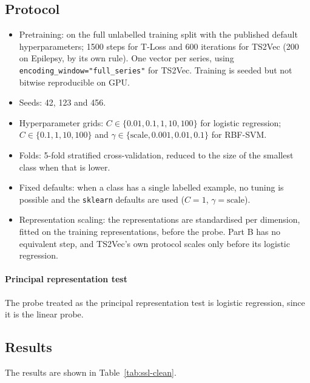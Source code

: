 \documentclass[a4paper,11pt]{article}
\newcommand{\code}[1]{\texttt{#1}}
\begin{document}
\subsection{Protocol}
\begin{itemize}
    \item Pretraining: on the full unlabelled training split with the published default hyperparameters; 1500 steps for T-Loss and 600 iterations for TS2Vec (200 on Epilepsy, by its own rule). One vector per series, using \code{encoding\_window="full\_series"} for TS2Vec. Training is seeded but not bitwise reproducible on GPU.
    \item Seeds: 42, 123 and 456.
    \item Hyperparameter grids: $C \in \{0.01, 0.1, 1, 10, 100\}$ for logistic regression; $C \in \{0.1, 1, 10, 100\}$ and $\gamma \in \{\text{scale}, 0.001, 0.01, 0.1\}$ for RBF-SVM.
    \item Folds: 5-fold stratified cross-validation, reduced to the size of the smallest class when that is lower.
    \item Fixed defaults: when a class has a single labelled example, no tuning is possible and the \code{sklearn} defaults are used ($C = 1$, $\gamma = \text{scale}$).
    \item Representation scaling: the representations are standardised per dimension, fitted on the training representations, before the probe. Part B has no equivalent step, and TS2Vec's own protocol scales only before its logistic regression.
\end{itemize}

\paragraph{Principal representation test}
The probe treated as the principal representation test is logistic regression, since it is the linear probe.

\subsection{Results}
The results are shown in Table~\ref{tab:ssl-clean}.
\end{document}
